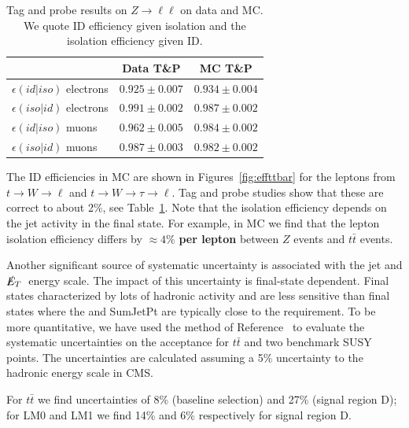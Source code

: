 \begin{table}[hbt]
\begin{center}
\caption{\label{tab:tagandprobe} Tag and probe results on $Z \to \ell \ell$
on data and MC.  We quote ID efficiency given isolation and 
the isolation efficiency given ID. }
\begin{tabular}{|l||c|c|}
\hline
                             & Data  T\&P      & MC T\&P             \\  
\hline
$\epsilon(id|iso)$ electrons & $0.925 \pm 0.007$ & $0.934 \pm 0.004$ \\
$\epsilon(iso|id)$ electrons & $0.991 \pm 0.002$ & $0.987 \pm 0.002$ \\
$\epsilon(id|iso)$ muons     & $0.962 \pm 0.005$ & $0.984 \pm 0.002$ \\
$\epsilon(iso|id)$ muons     & $0.987 \pm 0.003$ & $0.982 \pm 0.002$ \\ 
\hline
\end{tabular}
\end{center}
\end{table}


The ID efficiencies in MC are shown in 
Figures~\ref{fig:effttbar}
for the leptons from $t \to W \to \ell$ and $t \to W \to \tau \to \ell$.
Tag and probe studies show that these are correct to about 2\%,
see Table~\ref{tab:tagandprobe}.
Note that the isolation efficiency depends on the jet activity in
the final state.  For example, in MC we find that the
lepton isolation efficiency differs by $\approx 4\%$ 
{\bf per lepton} between $Z$ events and $t\bar{t}$ events\cite{ref:top}.

Another significant source of systematic uncertainty is 
associated with the jet and $\met$ energy scale.  The impact
of this uncertainty is final-state dependent.  Final
states characterized by lots of hadronic activity and \met are 
less sensitive than final states where the \met and SumJetPt
are typically close to the requirement.  To be more quantitative,
we have used the method of Reference~\cite{ref:top} to evaluate
the systematic uncertainties on the acceptance for $t\bar{t}$ 
and two benchmark SUSY points.  The uncertainties are calculated
assuming a 5\% uncertainty to the hadronic energy scale in CMS.

For $t\bar{t}$ we find uncertainties of 8\% (baseline 
selection) and 27\% (signal region D); for LM0 and LM1 we find
14\% and 6\% respectively for signal region D.

\clearpage